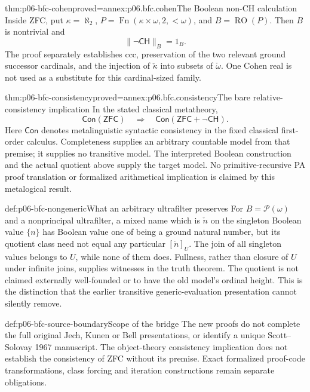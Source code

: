 \begin{hbtheorem}{thm:p06-bfc-cohen}{proved=annex:p06.bfc.cohen}{The Boolean non-CH calculation}
Inside ZFC, put \(\kappa=\aleph_2\),
\(P=\operatorname{Fn}(\kappa\times\omega,2,{<}\omega)\), and
\(B=\operatorname{RO}(P)\). Then \(B\) is nontrivial and
\[
 \lVert\neg\mathsf{CH}\rVert_B=1_B.
\]
The proof separately establishes ccc, preservation of the two relevant
ground successor cardinals, and the injection of \(\check\kappa\)
into subsets of \(\check\omega\). One Cohen real is not used as a
substitute for this cardinal-sized family.
\end{hbtheorem}

\begin{hbtheorem}{thm:p06-bfc-consistency}{proved=annex:p06.bfc.consistency}{The bare relative-consistency implication}
In the stated classical metatheory,
\[
 \mathsf{Con}(\mathsf{ZFC})
 \quad\Longrightarrow\quad
 \mathsf{Con}(\mathsf{ZFC}+\neg\mathsf{CH}).
\]
Here \(\mathsf{Con}\) denotes metalinguistic syntactic consistency in
the fixed classical first-order calculus. Completeness supplies an arbitrary
countable model from that premise; it supplies no transitive model.
The interpreted Boolean construction and the actual quotient above supply
the target model. No primitive-recursive PA proof translation or formalized
arithmetical implication is claimed by this metalogical result.
\end{hbtheorem}

\begin{hbexample}{def:p06-bfc-nongeneric}{What an arbitrary ultrafilter preserves}
For \(B=\mathcal P(\omega)\) and a nonprincipal ultrafilter, a mixed name
which is \(\check n\) on the singleton Boolean value \(\{n\}\) has
Boolean value one of being a ground natural number, but its quotient class
need not equal any particular \([\check n]_U\). The join of all singleton
values belongs to \(U\), while none of them does. Fullness, rather than
closure of \(U\) under infinite joins, supplies witnesses in the truth
theorem. The quotient is not claimed externally well-founded or to have
the old model's ordinal height. This is the distinction that the earlier
transitive generic-evaluation presentation cannot silently remove.
\end{hbexample}

\begin{proofboundary}{def:p06-bfc-source-boundary}{Scope of the bridge}
The new proofs do not complete the full original Jech, Kunen or Bell
presentations, or identify a unique Scott--Solovay 1967 manuscript.
The object-theory consistency implication does not establish the consistency
of ZFC without its premise. Exact formalized proof-code transformations,
class forcing and iteration constructions remain separate obligations.
\end{proofboundary}
